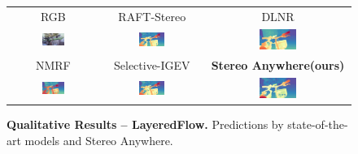 \documentclass[10pt,twocolumn,letterpaper]{article}
\newcommand{\method}[0]{Stereo Anywhere\xspace}
\begin{document}
\begin{figure}[h]
\begin{tabular}{ccc}
        \small RGB &
        \small RAFT-Stereo \cite{lipson2021raft} &
        \small DLNR \cite{zhao2023high} \\
        \includegraphics[width=0.27\textwidth]{imgs/layeredflow/rgb/333.jpg} &
        \includegraphics[width=0.27\textwidth]{imgs/layeredflow/stereo/RAFT-Stereo/333.jpg} &
        \includegraphics[width=0.27\textwidth]{imgs/layeredflow/stereo/DLNR/333.jpg} \\
        \small NMRF \cite{guan2024neural} &
        \small Selective-IGEV \cite{wang2024selective} &
        \textbf{\method (ours)} \\
        \includegraphics[width=0.27\textwidth]{imgs/layeredflow/stereo/NMRF/333.jpg} &
        \includegraphics[width=0.27\textwidth]{imgs/layeredflow/stereo/Selective/333.jpg} &
        \includegraphics[width=0.27\textwidth]{imgs/layeredflow/stereo/Ours/333.jpg} \\

    \end{tabular}\vspace{-0.3cm}
    \caption{\textbf{Qualitative Results -- LayeredFlow.} Predictions by state-of-the-art models and \method.}
    \label{fig:qual_layered}\vspace{-0.3cm}
\end{figure}
\end{document}
